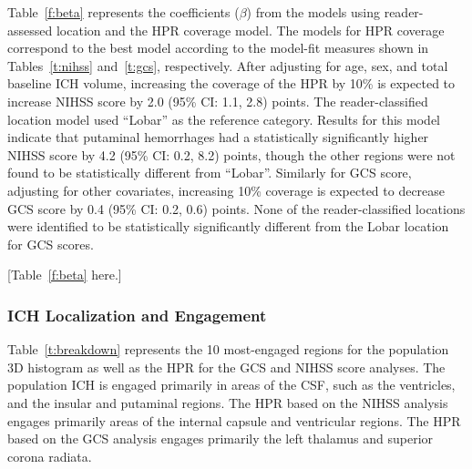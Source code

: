 \documentclass[10pt]{article}\usepackage[]{graphicx}\usepackage[]{color}
\begin{document}
Table~\ref{f:beta} represents the coefficients ($\beta$) from the models using reader-assessed location and the HPR coverage model.  The models for HPR coverage correspond to the best model according to the model-fit measures shown in Tables~\ref{t:nihss} and~\ref{t:gcs}, respectively. After adjusting for age, sex, and total baseline ICH volume, increasing the coverage of the HPR by 10\% is expected to increase NIHSS score by 2.0 (95\% CI: 1.1, 2.8) points.  The reader-classified location model used ``Lobar'' as the reference category. Results for this model indicate that putaminal hemorrhages had a statistically significantly higher NIHSS score by 4.2 (95\% CI: 0.2, 8.2) points, though the other regions were not found to be statistically different from ``Lobar''. 
Similarly for GCS score, adjusting for other covariates, increasing 10\% coverage is expected to decrease GCS score by 0.4 (95\% CI: 0.2, 0.6) points.  None of the reader-classified locations were identified to be statistically significantly different from the Lobar location for GCS scores.

[Table~\ref{f:beta} here.]








\subsubsection{ICH Localization and Engagement}

Table~\ref{t:breakdown} represents the 10 most-engaged regions for the population 3D histogram as well as the HPR for the GCS and NIHSS score  analyses.  The population ICH is engaged primarily in areas of the CSF, such as the ventricles, and the insular and putaminal regions. The HPR based on the NIHSS analysis engages primarily areas of the internal capsule and ventricular regions. The HPR based on the GCS analysis engages primarily the left thalamus and superior corona radiata.
\end{document}

